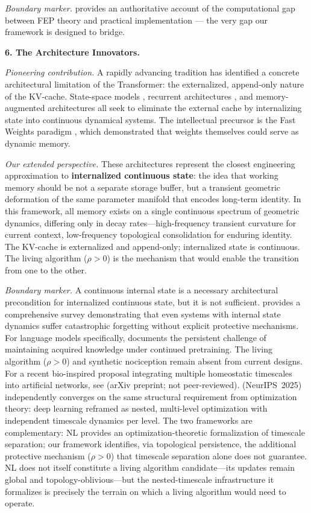 \documentclass{article}
\begin{document}
\emph{Boundary marker.} \citet{Buckley2017FEPreview} provides an authoritative account of the computational gap between FEP theory and practical implementation — the very gap our framework is designed to bridge.

\bigskip
\noindent\textbf{6. The Architecture Innovators.}

\emph{Pioneering contribution.} A rapidly advancing tradition has identified a concrete architectural limitation of the Transformer: the externalized, append-only nature of the KV-cache. State-space models \citep{Gu2023mamba}, recurrent architectures \citep{Peng2023rwkv,Beck2024xlstm}, and memory-augmented architectures \citep{Behrouz2024titans} all seek to eliminate the external cache by internalizing state into continuous dynamical systems. The intellectual precursor is the Fast Weights paradigm \citep{Ba2016fastweights}, which demonstrated that weights themselves could serve as dynamic memory.

\emph{Our extended perspective.} These architectures represent the closest engineering approximation to \textbf{internalized continuous state}: the idea that working memory should be not a separate storage buffer, but a transient geometric deformation of the same parameter manifold that encodes long-term identity. In this framework, all memory exists on a single continuous spectrum of geometric dynamics, differing only in decay rates---high-frequency transient curvature for current context, low-frequency topological consolidation for enduring identity. The KV-cache is externalized and append-only; internalized state is continuous. The living algorithm ($\rho > 0$) is the mechanism that would enable the transition from one to the other.

\emph{Boundary marker.} A continuous internal state is a necessary architectural precondition for internalized continuous state, but it is not sufficient. \citet{DeLange2021continual} provides a comprehensive survey demonstrating that even systems with internal state dynamics suffer catastrophic forgetting without explicit protective mechanisms. For language models specifically, \citet{Ke2022pretraining} documents the persistent challenge of maintaining acquired knowledge under continued pretraining. The living algorithm ($\rho > 0$) and synthetic nociception remain absent from current designs. For a recent bio-inspired proposal integrating multiple homeostatic timescales into artificial networks, see \citet{Hakim2026MSTH} (arXiv preprint; not peer-reviewed). \citet{Behrouz2025nested} (NeurIPS~2025) independently converges on the same structural requirement from optimization theory: deep learning reframed as nested, multi-level optimization with independent timescale dynamics per level. The two frameworks are complementary: NL provides an optimization-theoretic formalization of timescale separation; our framework identifies, via topological persistence, the additional protective mechanism ($\rho > 0$) that timescale separation alone does not guarantee. NL does not itself constitute a living algorithm candidate---its updates remain global and topology-oblivious---but the nested-timescale infrastructure it formalizes is precisely the terrain on which a living algorithm would need to operate.
\end{document}
